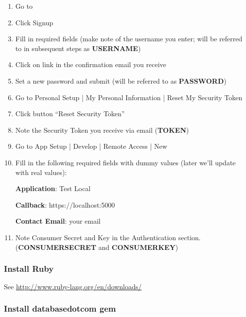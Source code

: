 \documentclass{article}
\begin{document}
\begin{enumerate}%
\item Go to 


\item Click Signup


\item Fill in required fields (make note of the username you enter; will be referred to in subsequent steps as \textbf{USERNAME})


\item Click on link in the confirmation email you receive


\item Set a new password and submit (will be referred to as \textbf{PASSWORD})


\item Go to Personal Setup | My Personal Information | Reset My Security Token


\item Click button ``{}Reset Security Token''{}


\item Note the Security Token you receive via email (\textbf{TOKEN})


\item Go to App Setup | Develop | Remote Access | New


\item Fill in the following required fields with dummy values (later we'{}ll update with real values):

\textbf{Application}: Test Local

\textbf{Callback}: https://localhost:5000

\textbf{Contact Email}: your email


\item Note Consumer Secret and Key in the Authentication section. (\textbf{CONSUMERSECRET} and \textbf{CONSUMERKEY})



\end{enumerate}
\hypertarget{install_ruby}{}\subsubsection*{{Install Ruby}}\label{install_ruby}

See \href{http://www.ruby-lang.org/en/downloads/}{http://www.ruby-lang.org/en/downloads/}

\hypertarget{install_databasedotcom_gem}{}\subsubsection*{{Install databasedotcom gem}}\label{install_databasedotcom_gem}
\end{document}
